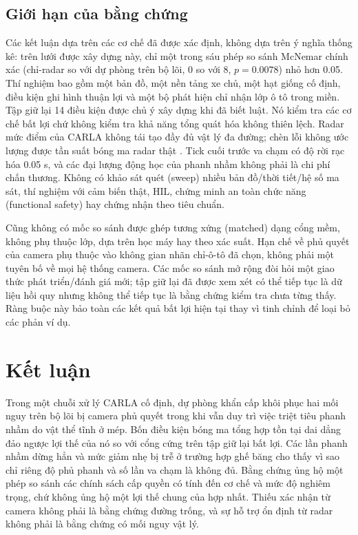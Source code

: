 \documentclass[conference]{IEEEtran}
\begin{document}
\subsection{Giới hạn của bằng chứng}\label{sec:limits}
Các kết luận dựa trên các cơ chế đã được xác định, không dựa trên ý nghĩa
thống kê: trên lưới được xây dựng này, chỉ một trong sáu phép so sánh McNemar
chính xác (chỉ-radar so với dự phòng trên bộ lõi, 0 so với 8, $p=0.0078$) nhỏ
hơn 0.05.
Thí nghiệm bao gồm một bản đồ, một nền tảng xe chủ, một hạt giống cố định, điều
kiện ghi hình thuận lợi và một bộ phát hiện chỉ nhận lớp ô tô trong miền. Tập giữ lại 14 điều kiện được chủ ý xây
dựng khi đã biết luật. Nó kiểm tra các cơ chế bất lợi chứ không kiểm tra khả
năng tổng quát hóa không thiên lệch. Radar mức điểm của CARLA không tái tạo đầy
đủ vật lý đa đường; chèn lỗi không ước lượng được tần suất bóng ma radar thật
\cite{kraus2021ghost,magosi2022radar}. Tick cuối trước va chạm có độ rời rạc
hóa 0.05 s, và các đại lượng động học của phanh nhầm không phải là chi phí
chấn thương. Không có khảo sát quét (sweep) nhiều bản đồ/thời tiết/hệ số ma
sát, thí nghiệm với cảm biến thật, HIL, chứng minh an toàn chức năng
(functional safety) hay chứng nhận theo tiêu chuẩn.

Cũng không có mốc so sánh được ghép tương xứng (matched) dạng cổng mềm, không
phụ thuộc lớp, dựa trên học máy hay theo xác suất. Hạn chế về phủ quyết của
camera phụ thuộc vào không gian nhãn chỉ-ô-tô đã chọn, không phải một tuyên bố
về mọi hệ thống camera. Các mốc so sánh mở rộng đòi hỏi một giao thức phát
triển/đánh giá mới; tập giữ lại đã được xem xét có thể tiếp tục là dữ liệu hồi
quy nhưng không thể tiếp tục là bằng chứng kiểm tra chưa từng thấy. Ràng buộc
này bảo toàn các kết quả bất lợi hiện tại thay vì tinh chỉnh để loại bỏ các
phản ví dụ.

\section{Kết luận}
Trong một chuỗi xử lý CARLA cố định, dự phòng khẩn cấp khôi phục hai mối nguy
trên bộ lõi bị camera phủ quyết trong khi vẫn duy trì việc triệt tiêu phanh
nhầm do vật thể tĩnh ở mép. Bốn điều kiện bóng ma tổng hợp tồn tại dai dẳng
đảo ngược lợi thế của nó so với cổng cứng trên tập giữ lại bất lợi. Các lần
phanh nhầm dừng hẳn và mức giảm nhẹ bị trễ ở trường hợp ghế băng cho thấy vì
sao chỉ riêng độ phủ phanh và số lần va chạm là không đủ. Bằng chứng ủng hộ
một phép so sánh các chính sách cấp quyền có tính đến cơ chế và mức độ nghiêm
trọng, chứ không ủng hộ một lợi thế chung của hợp nhất. Thiếu xác nhận từ
camera không phải là bằng chứng đường trống, và sự hỗ trợ ổn định từ radar
không phải là bằng chứng có mối nguy vật lý.
\end{document}
